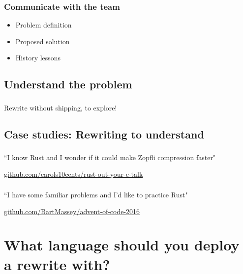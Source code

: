 \documentclass{beamer}
\begin{document}
\begin{frame}[fragile]
\frametitle{Communicate with the team}
\begin{itemize}[<+(1)->]
\item Problem definition
\item Proposed solution
\item History lessons
\end{itemize}
\end{frame}

\subsection{Understand the problem}

\begin{frame}[fragile]
\tableofcontents[currentsubsection]
\end{frame}

\begin{frame}[fragile]
\frametitle{\insertsubsectionhead}
Rewrite without shipping, to explore!
\end{frame}

\subsection{Case studies: Rewriting to understand}

\begin{frame}[fragile]
\frametitle{\insertsubsectionhead}

``I know Rust and I wonder if it could make Zopfli compression faster"

\url{github.com/carols10cents/rust-out-your-c-talk}

\end{frame}

\begin{frame}[fragile]
\frametitle{\insertsubsectionhead}

``I have some familiar problems and I'd like to practice Rust"

\url{github.com/BartMassey/advent-of-code-2016}

\end{frame}

\section{What language should you deploy a rewrite with?}

\begin{frame}[fragile]
\tableofcontents [currentsection]
\end{frame}
\end{document}
